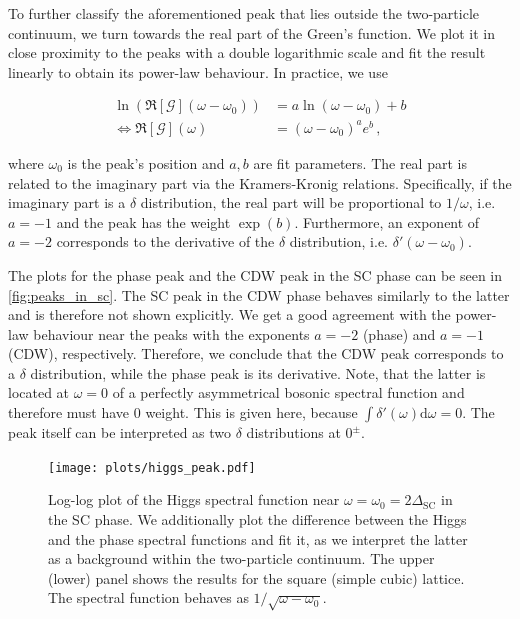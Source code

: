 \documentclass[
    reprint, 
    aps,
    preprintnumbers,
    twocolumn,
    prb,
    superscriptaddress
]{revtex4-2}
\begin{document}
To further classify the aforementioned peak that lies outside the two-particle continuum,
we turn towards the real part of the Green's function.
We plot it in close proximity to the peaks with a double logarithmic scale and fit the result linearly to obtain its power-law behaviour.
In practice, we use

\begin{align}
    \ln(\Re[\mathcal{G}](\omega - \omega_0 )) &= a \ln(\omega - \omega_0) + b \nonumber \\ 
    \Leftrightarrow \Re[\mathcal{G}] (\omega) &= (\omega - \omega_0)^a e^b\,,
\end{align}

where $\omega_0$ is the peak's position and $a, b$ are fit parameters.
The real part is related to the imaginary part via the Kramers-Kronig relations.
Specifically, if the imaginary part is a $\delta$ distribution, the real part will be proportional to $1/\omega$, i.e. $a=-1$ and the peak has the weight $\exp(b)$.
Furthermore, an exponent of $a=-2$ corresponds to the derivative of the $\delta$ distribution, i.e. $\delta'(\omega - \omega_0)$.

The plots for the phase peak and the CDW peak in the SC phase can be seen in \autoref{fig:peaks_in_sc}.
The SC peak in the CDW phase behaves similarly to the latter and is therefore not shown explicitly.
We get a good agreement with the power-law behaviour near the peaks with the exponents $a=-2$ (phase) and $a=-1$ (CDW), respectively.
Therefore, we conclude that the CDW peak corresponds to a $\delta$ distribution, while the phase peak is its derivative.
Note, that the latter is located at $\omega=0$ of a perfectly asymmetrical bosonic spectral function and therefore must have 0 weight.
This is given here, because $\int \delta'(\omega) \mathrm{d}\omega = 0$.
The peak itself can be interpreted as two $\delta$ distributions at $0^\pm$.

\begin{figure}
    \centering
    \texttt{[image: plots/higgs\_peak.pdf]}
    \caption{Log-log plot of the Higgs spectral function near $\omega = \omega_0 = 2\Delta_\text{SC}$ in the SC phase.
    We additionally plot the difference between the Higgs and the phase spectral functions and fit it, as we interpret the latter as a background within the two-particle continuum.
    The upper (lower) panel shows the results for the square (simple cubic) lattice.
    The spectral function behaves as $1 / \sqrt{\omega - \omega_0}$.}
    \label{fig:higgs_peak}
\end{figure}
\end{document}
